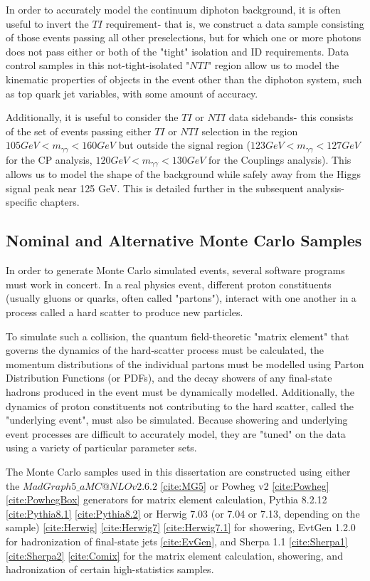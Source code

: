In order to accurately model the continuum diphoton background, it is often useful to invert the $TI$ requirement- that is, we construct a data sample consisting of those events passing all other preselections, but for which one or more photons does not pass either or both of the "tight" isolation and ID requirements. Data control samples in this not-tight-isolated "$NTI$" region allow us to model the kinematic properties of objects in the event other than the diphoton system, such as top quark jet variables, with some amount of accuracy.

Additionally, it is useful to consider the $TI$ or $NTI$ data sidebands- this consists of the set of events passing either $TI$ or $NTI$ selection in the region $105 GeV < m_{\gamma\gamma} < 160 GeV$ but outside the signal region ($123 GeV < m_{\gamma\gamma} < 127 GeV$ for the CP analysis, $120 GeV < m_{\gamma\gamma} < 130 GeV$ for the Couplings analysis). This allows us to model the shape of the background while safely away from the Higgs signal peak near 125 GeV. This is detailed further in the subsequent analysis-specific chapters.

\subsection{Nominal and Alternative Monte Carlo Samples} \label{sec:NominalMC} 

In order to generate Monte Carlo simulated events, several software programs must work in concert. In a real physics event, different proton constituents (usually gluons or quarks, often called "partons"), interact with one another in a process called a hard scatter to produce new particles. 

To simulate such a collision, the quantum field-theoretic "matrix element" that governs the dynamics of the hard-scatter process must be calculated, the momentum distributions of the individual partons must be modelled using Parton Distribution Functions (or PDFs), and the decay showers of any final-state hadrons produced in the event must be dynamically modelled. Additionally, the dynamics of proton constituents not contributing to the hard scatter, called the "underlying event", must also be simulated. Because showering and underlying event processes are difficult to accurately model, they are "tuned" on the data using a variety of particular parameter sets. 

The Monte Carlo samples used in this dissertation are constructed using either the $MadGraph5\_aMC@NLO v2.6.2$ \ref{cite:MG5} or Powheg v2 \ref{cite:Powheg} \ref{cite:PowhegBox} generators for matrix element calculation, Pythia 8.2.12 \ref{cite:Pythia8.1} \ref{cite:Pythia8.2} or Herwig 7.03 (or 7.04 or 7.13, depending on the sample) \ref{cite:Herwig} \ref{cite:Herwig7} \ref{cite:Herwig7.1} for showering, EvtGen 1.2.0 for hadronization of final-state jets \ref{cite:EvGen}, and Sherpa 1.1 \ref{cite:Sherpa1} \ref{cite:Sherpa2} \ref{cite:Comix} for the matrix element calculation, showering, and hadronization of certain high-statistics samples.

